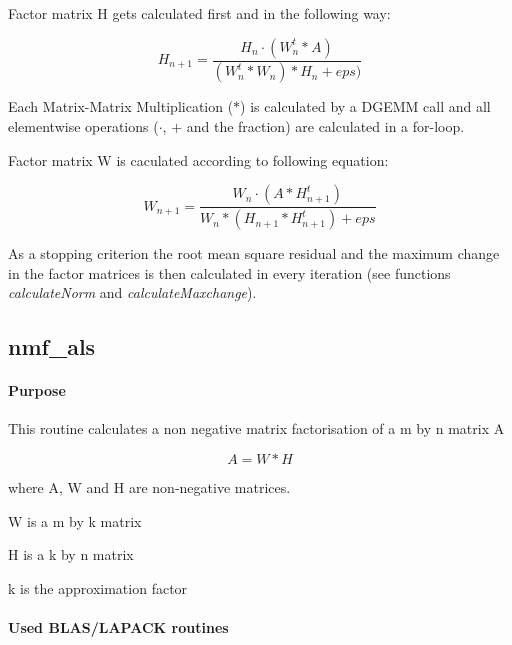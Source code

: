 \documentclass[a4paper,10pt]{scrartcl}
\begin{document}
					Factor matrix H gets calculated first and in the following way:\newline

					\begin{equation*}
						H_{n+1} = \dfrac{H_{n} \cdot (W_{n}^t * A)}{(W_n^t * W_n)* H_n + eps)} 
					\end{equation*}

					Each Matrix-Matrix Multiplication ($*$) is calculated by a DGEMM call and
					all elementwise operations ($\cdot$, $+$ and the fraction) are calculated
					in a for-loop.\newline

					Factor matrix W is caculated according to following equation:\newline
					
					\begin{equation*}
						W_{n+1} = \dfrac{W_{n} \cdot (A * H_{n+1}^t)}{W_n * (H_{n+1}* H_{n+1}^t) + eps}
					\end{equation*}


					As a stopping criterion the root mean square residual and the maximum 
					change in the factor matrices is then calculated in every iteration (see
					functions \emph{calculateNorm} and \emph{calculateMaxchange}).\newline



		\subsection{nmf\_als}

			\paragraph{Purpose}

					This routine calculates a non negative matrix factorisation of a m by n 
					matrix A\newline
					
					\begin{equation*}
						A = W * H
					\end{equation*}

 					where A, W and H are non-negative matrices.

 					W is a m by k matrix

 					H is a k by n matrix

 					k is the approximation factor

			\paragraph{Used BLAS/LAPACK routines}
\end{document}
